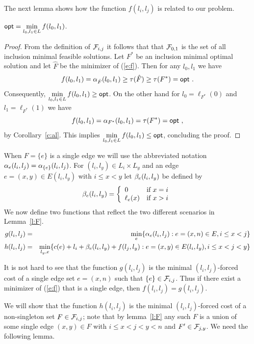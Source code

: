 \documentclass[a4paper,UKenglish,autoref]{lipics-v2019}
\begin{document}
The next lemma shows how the function $f(l_i,l_j)$ is related to our problem. 

\begin{lemma}
${\sf opt}=\displaystyle{\min_{l_0,l_1 \in L}f(l_0,l_1)}$.
\end{lemma}
\begin{proof}
From the definition of ${\cal F}_{i,j}$ it follows that that  ${\cal F}_{0,1}$ is the set of all inclusion minimal feasible solutions.
Let $F^*$ be an inclusion minimal optimal solution and let $\hat F$ be the minimizer of (\ref{e:f}).
Then for any $l_0,l_1$ we have
\[
f(l_0,l_1)=\alpha_{\hat F}(l_0,l_1) \geq \tau(\hat F) \geq \tau(F^*) = {\sf opt} \ .
\]
Consequently, $\displaystyle{\min_{l_0,l_1 \in L}f(l_0,l_1)} \geq {\sf opt}$.
On the other hand for $l_0=\ell_{F^*}(0)$ and  $l_1=\ell_{F^*}(1)$ we have 
\[
f(l_0,l_1)=\alpha_{F^*}(l_0,l_1)=\tau(F^*)={\sf opt} \ ,
\] 
by Corollary~\ref{c:al}. This implies $\displaystyle{\min_{l_0,l_1 \in L}f(l_0,l_1)} \leq {\sf opt}$, concluding the proof.
\end{proof}

When $F=\{e\}$ is a single edge we will use the abbreviated notation $\alpha_e(l_i,l_j)=\alpha_{\{e\}}(l_i,l_j)$. 
For  $(l_i,l_y) \in L_i \times L_y$ and an edge $e=(x,y) \in E(l_i,l_y)$ with $i \leq x <y$ let $\beta_e(l_i,l_y)$ be defined by
\[
\beta_e(l_i,l_y)= \left \{ \begin{array}{ll}
0                     & \mbox{if} \ x=i \\
 \ell_e(x)        & \mbox{if} \ x>i
\end{array} \right .
\]
We now define two functions that reflect the two different scenarios in Lemma~\ref{l:F}. 
\begin{eqnarray*}
g(l_i,l_j) & = & \min_e\{\alpha_e(l_i,l_j) : e=(x,n) \in E, i \leq x <j\} \\
h(l_i,l_j) & = & \min_{l_y,e}\{c(e)+l_i+\beta_e(l_i,l_y)+f(l_j,l_y):  e=(x,y) \in E(l_i,l_y), i \leq x <j<y\}
\end{eqnarray*}

It is not hard to see that the function $g(l_i,l_j)$ is the minimal $(l_i,l_j)$-forced cost of a single edge set $e=(x,n)$ such that 
$\{e\} \in {\cal F}_{i,j}$.
Thus if there exist a minimizer of (\ref{e:f}) that is a single edge, then $f(l_i,l_j)=g(l_i,l_j)$. 

We will show that the function $h(l_i,l_j)$ is the minimal $(l_i,l_j)$-forced cost of a non-singleton set $F \in {\cal F}_{i,j}$;
note that by lemma~\ref{l:F} any such $F$ is a union of some single edge $(x,y) \in F$ with $i \leq x<j<y < n$ and $F' \in {\cal F}_{j,y}$.
We need the following lemma.
\end{document}
